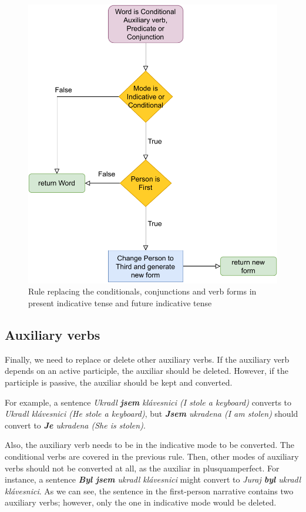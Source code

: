 \begin{figure}[!htbp]
\includegraphics[width=\textwidth]{data/Icher-Predicate-Rule.pdf}
\caption{Rule replacing the conditionals, conjunctions and verb forms in present indicative tense and future indicative tense}
\label{fig:icher-predicate-rule}
\end{figure}

\subsection{Auxiliary verbs}

Finally, we need to replace or delete other auxiliary verbs. If the auxiliary verb depends on an active participle, the auxiliar should be deleted. However, if the participle is passive, the auxiliar should be kept and converted.

For example, a sentence \emph{Ukradl \textbf{jsem} klávesnici (I stole a keyboard)} converts to \emph{Ukradl klávesnici (He stole a keyboard)}, but \emph{\textbf{Jsem} ukradena (I am stolen)} should convert to \emph{\textbf{Je} ukradena (She is stolen)}.

Also, the auxiliary verb needs to be in the indicative mode to be converted. The conditional verbs are covered in the previous rule. Then, other modes of auxiliary verbs should not be converted at all, as the auxiliar in plusquamperfect. For instance, a sentence \emph{\textbf{Byl jsem} ukradl klávesnici} might convert to \emph{Juraj \textbf{byl} ukradl klávesnici}. As we can see, the sentence in the first-person narrative contains two auxiliary verbs; however, only the one in indicative mode would be deleted.

